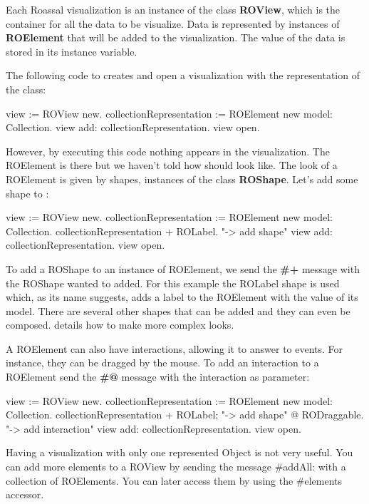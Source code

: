 \documentclass[a4paper,10pt,twoside]{book}
\begin{document}
Each Roassal visualization is an instance of the class \textbf{ROView}, which is the container for all the data to be visualize.
Data is represented by instances of \textbf{ROElement} that will be added to the visualization. The value of the data is stored in its  instance variable.

The following code to creates and open a visualization with the representation of the  class:

\begin{code}{}
view := ROView new.
collectionRepresentation := ROElement new model: Collection.
view add: collectionRepresentation.
view open.
\end{code}


However, by executing this code nothing appears in the visualization. The ROElement is there but we haven't told how  should look like. The look of a ROElement is given by shapes, instances of the class \textbf{ROShape}. Let's add some shape to :

\begin{code}{}
view := ROView new.
collectionRepresentation := ROElement new model: Collection.
collectionRepresentation 
	+ ROLabel. "-> add shape"
view add: collectionRepresentation.
view open.
\end{code}

To add a ROShape to an instance of ROElement, we send the \textbf{\#+} message with the ROShape wanted to added. For this example the ROLabel shape is used which, as its name suggests, adds a label to the ROElement with the value of its model. There are several other shapes that can be added and they can even be composed.  details how to make more complex looks.

A ROElement can also have interactions, allowing it to answer to events. For instance, they can be dragged by the mouse. To add an interaction to a ROElement send the \textbf{\#@} message with the interaction as parameter: 

\begin{code}{}
view := ROView new.
collectionRepresentation := ROElement new model: Collection.
collectionRepresentation 
	+ ROLabel; "-> add shape"
	@ RODraggable. "-> add interaction"
view add: collectionRepresentation.
view open.
\end{code}

Having a visualization with only one represented Object is not very useful. You can add more elements to a ROView by sending the message \#addAll: with a collection of ROElements. You can later access them by using the \#elements accessor. 
\end{document}
